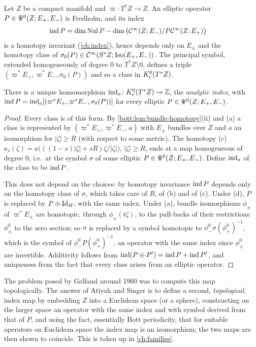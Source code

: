 Let $Z$ be a compact manifold and $\varpi\colon T^*Z\to Z$. An elliptic operator
$P\in\Psi^{0}(Z;E_+,E_-)$ is Fredholm, and its index
\begin{equation*}
  \operatorname{ind} P=\dim\operatorname{Nul} P-\dim\big(\mathcal{C}^\infty(Z;E_-)/P\mathcal{C}^\infty(Z;E_+)\big)
\end{equation*}
is a homotopy invariant (\cref{ch:index}), hence depends only on $E_\pm$ and the homotopy class
of $\sigma_0(P)\in\mathcal{C}^\infty(S^*Z;\operatorname{Iso}(E_+,E_-))$. The principal symbol, extended homogeneously of degree
$0$ to $T^*Z\setminus0$, defines a triple $(\varpi^*E_+,\varpi^*E_-,\sigma_0(P))$ and so a class in
$K_{\mathrm{c}}^0(T^*Z)$.

\begin{proposition}\label{bott:prop:analytic-index}
  There is a unique homomorphism $\operatorname{ind}_a\colon K_{\mathrm{c}}^0(T^*Z)\to\mathbb{Z}$, the \emph{analytic index},
  with $\operatorname{ind} P=\operatorname{ind}_a[(\varpi^*E_+,\varpi^*E_-,\sigma_0(P))]$ for every elliptic
  $P\in\Psi^{0}(Z;E_+,E_-)$.
\end{proposition}
\begin{proof}
  Every class is of this form. By \cref{bott:lem:bundle-homotopy}(ii) and (a) a class is
  represented by $(\varpi^*E_+,\varpi^*E_-,a)$ with $E_\pm$ bundles over $Z$ and $a$ an isomorphism
  for $|\zeta|\ge R$ (with respect to some metric). The homotopy (c)
  $a_s(\zeta)=a\big(((1-s)|\zeta|+sR)\zeta/|\zeta|\big)$, $|\zeta|\ge R$, ends at a map homogeneous
  of degree $0$, i.e.\ at the symbol $\sigma$ of some elliptic $P\in\Psi^{0}(Z;E_+,E_-)$. Define
  $\operatorname{ind}_a$ of the class to be $\operatorname{ind} P$.

  This does not depend on the choices: by homotopy invariance $\operatorname{ind} P$ depends only on the
  homotopy class of $\sigma$, which takes care of $R$, of (b) and of (c). Under (d), $P$ is
  replaced by $P\oplus\operatorname{Id}_H$, with the same index. Under (a), bundle isomorphisms $\phi_\pm$ of
  $\varpi^*E_\pm$ are homotopic, through $\phi_\pm(t\zeta)$, to the pull-backs of their
  restrictions $\phi^0_\pm$ to the zero section; so $\sigma$ is replaced by a symbol homotopic to
  $\phi^0_-\sigma(\phi^0_+)^{-1}$, which is the symbol of $\phi^0_-P(\phi^0_+)^{-1}$, an operator with
  the same index since $\phi_\pm^0$ are invertible. Additivity follows from
  $\operatorname{ind}(P\oplus P')=\operatorname{ind} P+\operatorname{ind} P'$, and uniqueness from the fact that every class arises from an
  elliptic operator.
\end{proof}

The problem posed by Gelfand around 1960 was to compute this map topologically. The answer of
Atiyah and Singer is to define a second, \emph{topological}, index map by embedding $Z$ into a
Euclidean space (or a sphere), constructing on the larger space an operator with the same index
and with symbol derived from that of $P$, and using the fact, essentially Bott periodicity, that
for suitable operators on Euclidean space the index map is an isomorphism; the two maps are then
shown to coincide. This is taken up in \cref{ch:families}.

